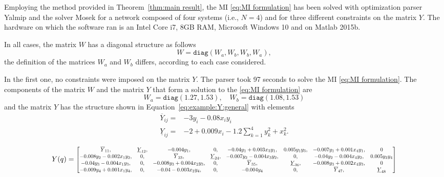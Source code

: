 \documentclass[10pt,twocolumn,twoside]{IEEEtran}
\theoremstyle{plain}
\theoremstyle{definition}
\theoremstyle{remark}
\begin{document}
Employing the method provided in Theorem~\ref{thm:main result}, the MI \eqref{eq:MI formulation} has been solved with optimization parser Yalmip \cite{Loefberg2004,Loefberg2009} and the solver Mosek for a network composed of four systems (i.e., $N=4$) and for three different constraints on the matrix $Y$. The hardware on which the software ran is an Intel Core i7, 8GB RAM, Microsoft Windows 10 and on Matlab 2015b.

In all cases, the matrix $W$ has a diagonal structure as follows
\begin{equation*}
 W=\mathbin{\mathtt{diag}}\left(W_a,W_b,W_b,W_a\right),
\end{equation*}
the definition of the matrices $W_a$ and $W_b$ differs, according to each case considered.

In the first one, no constraints were imposed on the matrix $Y$. The parser took 97 seconds to solve the  MI \eqref{eq:MI formulation}. The components of the matrix $W$ and the matrix $Y$ that form a solution to the \eqref{eq:MI formulation} are
\begin{equation*}
		W_a=\mathbin{\mathtt{diag}}\left(
 1.27,1.53\right),\quad W_b=\mathbin{\mathtt{diag}}\left(1.08,1.53\right)
\end{equation*}
and the matrix $Y$ has the structure shown in Equation~\eqref{eq:example:Y:general} with elements
\begin{align*}
 \overline{Y}_{ij}=&-3y_i-0.08x_iy_i\\
 \underline{Y}_{ij}=&-2+0.009x_i-1.2\sum_{k=1}^4 y_k^2+x_k^2.
\end{align*}

\begin{figure*}
\begin{equation}\label{eq:example:Y:general}
		Y(q)=\scalebox{0.75}{$\begin{bmatrix}
			\overline{Y}_{11},&\underline{Y}_{12},&-0.004y_1,&0,&-0.04y_1+0.003x_3y_1,&0.005y_1y_3,&-0.007y_1+0.001x_4y_1,&0\\
			-0.008y_2-0.002x_1y_2,&0,&\overline{Y}_{23},&\underline{Y}_{24},&-0.007y_2-0.004x_3y_2,&0,&-0.04y_2-0.004x_4y_2,&0.005y_2y_4\\
			-0.04y_3-0.004x_1y_3,&0,&-0.008y_3+0.004x_2y_3,&0,&\overline{Y}_{35},&\underline{Y}_{36},&-0.008y_3+0.002x_4y_3,&0\\
			-0.009y_4+0.001x_1y_4,&0,&-0.04-0.003x_2y_4,&0,&-0.004y_4&0,&\overline{Y}_{47},&\underline{Y}_{48}
		\end{bmatrix}$}
\end{equation}
\end{figure*}
\end{document}
